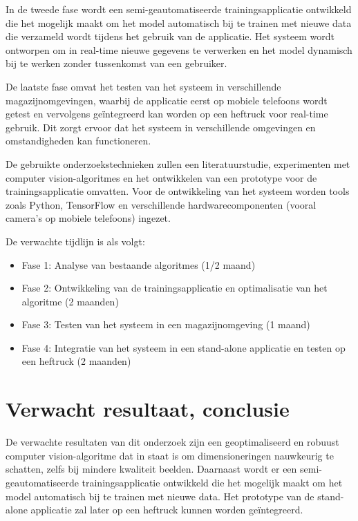 In de tweede fase wordt een semi-geautomatiseerde trainingsapplicatie ontwikkeld die het mogelijk maakt om het model automatisch bij te trainen met nieuwe data die verzameld wordt tijdens het gebruik van de applicatie. Het systeem wordt ontworpen om in real-time nieuwe gegevens te verwerken en het model dynamisch bij te werken zonder tussenkomst van een gebruiker. 

De laatste fase omvat het testen van het systeem in verschillende magazijnomgevingen, waarbij de applicatie eerst op mobiele telefoons wordt getest en vervolgens geïntegreerd kan worden op een heftruck voor real-time gebruik. Dit zorgt ervoor dat het systeem in verschillende omgevingen en omstandigheden kan functioneren.

De gebruikte onderzoekstechnieken zullen een literatuurstudie, experimenten met computer vision-algoritmes en het ontwikkelen van een prototype voor de trainingsapplicatie omvatten. Voor de ontwikkeling van het systeem worden tools zoals Python, TensorFlow en verschillende hardwarecomponenten (vooral camera’s op mobiele telefoons) ingezet.

De verwachte tijdlijn is als volgt:
\begin{itemize}
    \item Fase 1: Analyse van bestaande algoritmes (1/2 maand)
    \item Fase 2: Ontwikkeling van de trainingsapplicatie en optimalisatie van het algoritme (2 maanden)
    \item Fase 3: Testen van het systeem in een magazijnomgeving (1 maand)
    \item Fase 4: Integratie van het systeem in een stand-alone applicatie en testen op een heftruck (2 maanden)
\end{itemize}


\section{Verwacht resultaat, conclusie}
\label{sec:verwachte_resultaten}

De verwachte resultaten van dit onderzoek zijn een geoptimaliseerd en robuust computer vision-algoritme dat in staat is om dimensioneringen nauwkeurig te schatten, zelfs bij mindere kwaliteit beelden. Daarnaast wordt er een semi-geautomatiseerde trainingsapplicatie ontwikkeld die het mogelijk maakt om het model automatisch bij te trainen met nieuwe data. Het prototype van de stand-alone applicatie zal later op een heftruck kunnen worden geïntegreerd.

